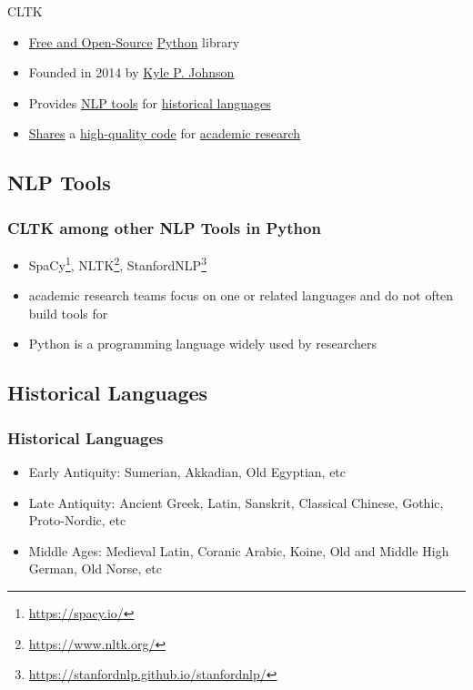 \documentclass{beamer}
\begin{document}
\begin{frame}{CLTK}
\begin{itemize}
    \item \underline{Free and Open-Source} \underline{Python} library
    \pause
    \item Founded in 2014 by \underline{Kyle P. Johnson}
    \pause
    \item Provides \underline{NLP tools} for \underline{historical languages}
    \pause
    \item \underline{Shares} a \underline{high-quality code} for \underline{academic research}
    
\end{itemize}{}
    
\end{frame}{}

\subsection{NLP Tools}
\begin{frame}
\frametitle{CLTK among other NLP Tools in Python}
\begin{itemize}
    
    \item SpaCy\footnote{\href{https://spacy.io/}{https://spacy.io/}}, NLTK\footnote{\href{https://www.nltk.org/}{https://www.nltk.org/}}, StanfordNLP\footnote{\href{https://stanfordnlp.github.io/stanfordnlp/}{https://stanfordnlp.github.io/stanfordnlp/}}
    \item academic research teams focus on one or related languages and do not often build tools for  
    \item Python is a programming language widely used by researchers
\end{itemize}
\end{frame}


\subsection{Historical Languages}

\begin{frame}
\frametitle{Historical Languages}
\begin{itemize}
    \item Early Antiquity: Sumerian, Akkadian, Old Egyptian, etc
    \item Late Antiquity: Ancient Greek, Latin, Sanskrit, Classical Chinese, Gothic, Proto-Nordic, etc
    \item Middle Ages: Medieval Latin, Coranic Arabic, Koine, Old and Middle High German, Old Norse, etc
\end{itemize}
\end{frame}
\end{document}
